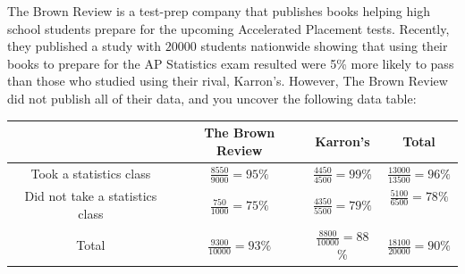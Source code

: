 \documentclass[12pt,letterpaper]{article}
\begin{document}
    The Brown Review is a test-prep company that publishes books helping high school students prepare for the upcoming Accelerated Placement tests. Recently, they published a study with $20000$ students nationwide showing that using their books to prepare for the AP Statistics exam resulted were 5\% more likely to pass than those who studied using their rival, Karron's. However, The Brown Review did not publish all of their data, and you uncover the following data table:
    \begin{center}
    \renewcommand{\arraystretch}{2}
    \begin{tabular}{| c | c | c | c |}
        \hline  & The Brown Review & Karron's & Total\\ 
        \hline Took a statistics class & $\frac{8550}{9000} = 95\%$ & $\frac{4450}{4500} = 99$\% & $\frac{13000}{13500} = 96 \%$\\
        \hline Did not take a statistics class & $\frac{750}{1000} = 75\%$ & $\frac{4350}{5500} = 79\%$ & $\frac{5100}{6500} = 78\%$\ \\
        \hline Total & $\frac{9300}{10000} = 93\%$ & $\frac{8800}{10000} = 88$\% & $\frac{18100}{20000} = 90\%$ \\
        \hline 
    \end{tabular}

    
    \renewcommand{\arraystretch}{1}
    \end{center}
\end{document}
